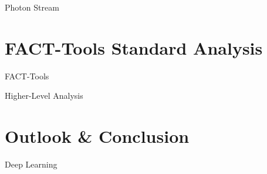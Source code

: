 \documentclass[compress, 9pt, aspectratio=1610, professionalfonts]{beamer}
\begin{document}
\begin{frame}[t]{Photon Stream}
\end{frame}

\section{FACT-Tools Standard Analysis}
\begin{frame}[t]{FACT-Tools}
\end{frame}

\begin{frame}[t]{Higher-Level Analysis}
\end{frame}

\section{Outlook \& Conclusion}

\begin{frame}[t]{Deep Learning}
\end{frame}
\end{document}
